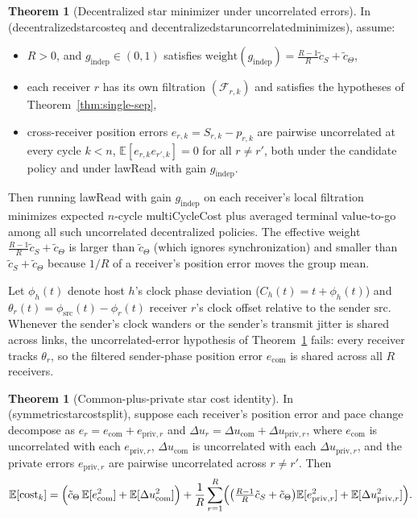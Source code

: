\documentclass[11pt,a4paper]{article}
\DeclareRobustCommand{\lean}[1]{{\ttfamily\def\_{\textunderscore\allowbreak}#1}}
\newcommand{\E}{\mathbb{E}}
\theoremstyle{definition}
\newtheorem{theorem}[definition]{Theorem}
\begin{document}
\begin{theorem}[Decentralized star minimizer under uncorrelated errors]
\label{thm:star-weight}
In  (\lean{decentralized\_star\_cost\_eq} and
\lean{decentralized\_star\_uncorrelated\_minimizes}), assume:
\begin{itemize}
\item $R > 0$, and $g_{\mathrm{indep}} \in (0, 1)$ satisfies
  $\mathrm{weight}(g_{\mathrm{indep}}) = \frac{R-1}{R}\tilde c_S + \tilde c_\Theta$,
\item each receiver $r$ has its own filtration $(\mathcal{F}_{r,k})$ and
  satisfies the hypotheses of Theorem~\ref{thm:single-sep},
\item cross-receiver position errors $e_{r,k} = S_{r,k} - p_{r,k}$ are pairwise
  uncorrelated at every cycle $k < n$, $\E[e_{r,k} e_{r',k}] = 0$ for all
  $r \ne r'$, both under the candidate policy and under \lean{lawRead} with
  gain $g_{\mathrm{indep}}$.
\end{itemize}
Then running \lean{lawRead} with gain $g_{\mathrm{indep}}$ on each receiver's
local filtration minimizes expected $n$-cycle \lean{multiCycleCost} plus
averaged terminal value-to-go among all such uncorrelated decentralized
policies. The effective weight $\frac{R-1}{R}\tilde c_S + \tilde c_\Theta$ is
larger than $\tilde c_\Theta$ (which ignores synchronization) and smaller than
$\tilde c_S + \tilde c_\Theta$ because $1/R$ of a receiver's position error
moves the group mean.
\end{theorem}

Let $\phi_h(t)$ denote host $h$'s clock phase deviation ($C_h(t) = t + \phi_h(t)$)
and $\theta_r(t) = \phi_{\mathrm{src}}(t) - \phi_r(t)$ receiver $r$'s clock
offset relative to the sender $\mathrm{src}$. Whenever the sender's clock
wanders or the sender's transmit jitter is shared across links, the
uncorrelated-error hypothesis of Theorem~\ref{thm:star-weight} fails: every
receiver tracks $\theta_r$, so the filtered sender-phase position error
$e_{\mathrm{com}}$ is shared across all $R$ receivers.

\begin{theorem}[Common-plus-private star cost identity]
\label{thm:star-split}
In  (\lean{symmetric\_star\_cost\_split}), suppose each
receiver's position error and pace change decompose as
$e_r = e_{\mathrm{com}} + e_{\mathrm{priv},r}$ and
$\Delta u_r = \Delta u_{\mathrm{com}} + \Delta u_{\mathrm{priv},r}$, where
$e_{\mathrm{com}}$ is uncorrelated with each $e_{\mathrm{priv},r}$,
$\Delta u_{\mathrm{com}}$ is uncorrelated with each $\Delta u_{\mathrm{priv},r}$,
and the private errors $e_{\mathrm{priv},r}$ are pairwise uncorrelated across
$r \ne r'$. Then
\[
  \E[\mathrm{cost}_k]
  = \Bigl(\tilde c_\Theta\,\E[e_{\mathrm{com}}^2] + \E[\Delta u_{\mathrm{com}}^2]\Bigr)
  + \frac{1}{R}\sum_{r=1}^R
    \Bigl(\bigl(\tfrac{R-1}{R}\tilde c_S + \tilde c_\Theta\bigr)\E[e_{\mathrm{priv},r}^2]
      + \E[\Delta u_{\mathrm{priv},r}^2]\Bigr) .
\]
\end{theorem}
\end{document}
